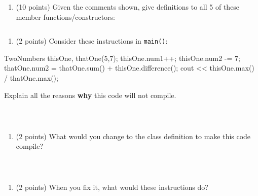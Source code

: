 \documentclass[
]{article}
\newenvironment{Shaded}{}{}
\newcommand{\DecValTok}[1]{\textcolor[rgb]{0.25,0.63,0.44}{#1}}
\newcommand{\NormalTok}[1]{#1}
\providecommand{\tightlist}{%
  \setlength{\itemsep}{0pt}\setlength{\parskip}{0pt}}
\begin{document}
\begin{enumerate}
\def\labelenumi{\alph{enumi}.}
\tightlist
\item
  (10 points) Given the comments shown, give definitions to all 5 of
  these member functions/constructors:
\end{enumerate}

\begin{verbatim}
\end{verbatim}

\pagebreak

\begin{enumerate}
\def\labelenumi{\alph{enumi}.}
\setcounter{enumi}{1}
\tightlist
\item
  (2 points) Consider these instructions in \texttt{main()}:
\end{enumerate}

\begin{Shaded}
\begin{Highlighting}[]
\NormalTok{TwoNumbers thisOne, thatOne(}\DecValTok{5}\NormalTok{,}\DecValTok{7}\NormalTok{);}
\NormalTok{thisOne.num1++;}
\NormalTok{thisOne.num2 {-}= }\DecValTok{7}\NormalTok{;}
\NormalTok{thatOne.num2 = thatOne.sum() + thisOne.difference();}
\NormalTok{cout \textless{}\textless{} thisOne.max() / thatOne.max();}
\end{Highlighting}
\end{Shaded}

Explain all the reasons \textbf{why} this code will not compile.

\begin{verbatim}



\end{verbatim}

\begin{enumerate}
\def\labelenumi{\alph{enumi}.}
\setcounter{enumi}{2}
\tightlist
\item
  (2 points) What would you change to the class definition to make this
  code compile?
\end{enumerate}

\begin{verbatim}



\end{verbatim}

\begin{enumerate}
\def\labelenumi{\alph{enumi}.}
\setcounter{enumi}{3}
\tightlist
\item
  (2 points) When you fix it, what would these instructions do?
\end{enumerate}

\begin{verbatim}
\end{verbatim}
\end{document}
